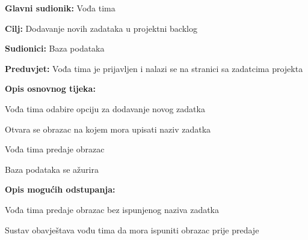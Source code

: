                         	\begin{packed_item}
                        		
                        		\item \textbf{Glavni sudionik: }Vođa tima
                        		\item  \textbf{Cilj:} Dodavanje novih zadataka u projektni backlog
                        		\item  \textbf{Sudionici:} Baza podataka
                        		\item  \textbf{Preduvjet:} Vođa tima je prijavljen i nalazi se na stranici sa zadatcima projekta
                        		\item  \textbf{Opis osnovnog tijeka:}
                        		
                        		\item[] \begin{packed_enum}
                        			
                        			\item Vođa tima odabire opciju za dodavanje novog zadatka
                        			\item Otvara se obrazac na kojem mora upisati naziv zadatka
                        			\item Vođa tima predaje obrazac
                        			\item Baza podataka se ažurira
                        			
                        		\end{packed_enum}
                        		
                        		\item  \textbf{Opis mogućih odstupanja:}
                        		
                        		\item[] \begin{packed_item}
                        			
                        			\item[3.a] Vođa tima predaje obrazac bez ispunjenog naziva zadatka
                        			\item[] \begin{packed_enum}
                        				
                        				\item Sustav obavještava vođu tima da mora ispuniti obrazac prije predaje
                        				
                        			\end{packed_enum}
                        			
                        			
                        		\end{packed_item}
                        	\end{packed_item}

